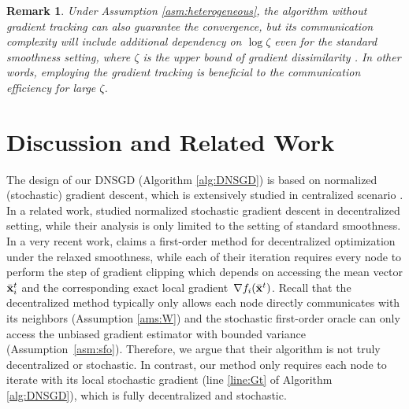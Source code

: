 \documentclass[sigconf]{acmart}
\def\vx{{\bf{x}}}
\theoremstyle{plain}
\newtheorem{remark}{Remark}
\def\bx{{\bar\vx}}
\begin{document}
\begin{remark}
Under Assumption \ref{asm:heterogeneous}, the algorithm without gradient tracking can also guarantee the convergence, but its communication complexity will include additional dependency on $\log\zeta$ even for the standard smoothness setting, where $\zeta$ is the upper bound of gradient  dissimilarity \citep[Section 5]{yuan2022revisiting}. 
In other words, employing the gradient tracking is beneficial to the communication efficiency for large $\zeta$.
\end{remark}

\section{Discussion and Related Work}

The design of our DNSGD (Algorithm \ref{alg:DNSGD}) is based on normalized (stochastic) gradient descent, which is extensively studied in centralized scenario \citep{mandic2004generalized,chen2023generalized,cutkosky2020momentum,hazan2015beyond,fang2018spider}. 
In a related work, \cite{li2024problem} studied normalized stochastic gradient descent in decentralized setting, while their analysis is only limited to the setting of standard smoothness.
In a very recent work, \citet[Algorithm 2 and Theorem 4]{jiang2025decentralized} claims a first-order method for decentralized optimization under the relaxed smoothness, while each of their iteration requires every node to perform the step of gradient clipping which depends on accessing the mean vector $\bx_i^t$ and the corresponding exact local gradient~$\nabla f_i(\bx^t)$.
Recall that the decentralized method typically only allows each node directly communicates with its neighbors (Assumption \ref{ams:W}) and the stochastic first-order oracle can only access the unbiased gradient estimator with bounded variance (Assumption~\ref{asm:sfo}).
Therefore, we argue that their algorithm is not truly decentralized or stochastic.
In contrast, our method only requires each node to iterate with its local stochastic gradient (line \ref{line:Gt} of Algorithm \ref{alg:DNSGD}), which is fully decentralized and stochastic.
\end{document}
